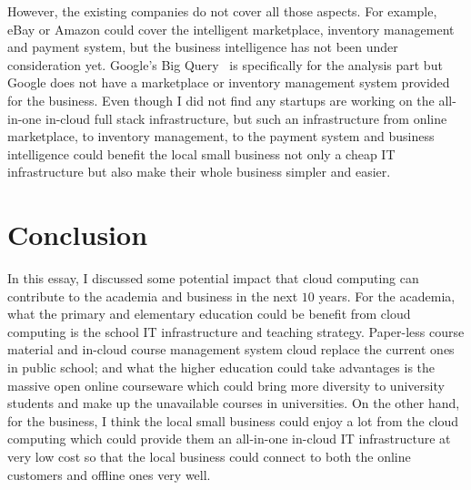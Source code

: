 However, the existing companies do not cover all those aspects. For example, eBay or Amazon could cover the intelligent marketplace, inventory management and payment system, but the business intelligence has not been under consideration yet. Google's Big Query~\cite{bigquery} is specifically for the analysis part but Google does not have a marketplace or inventory management system provided for the business. Even though I did not find any startups are working on the all-in-one in-cloud full stack infrastructure, but such an infrastructure from online marketplace, to inventory management, to the payment system and business intelligence could benefit the local small business not only a cheap IT infrastructure but also make their whole business simpler and easier. 

\section{Conclusion}
In this essay, I discussed some potential impact that cloud computing can contribute to the academia and business in the next $10$ years. For the academia, what the primary and elementary education could be benefit from cloud computing is the school IT infrastructure and teaching strategy. Paper-less course material and in-cloud course management system cloud replace the current ones in public school; and what the higher education could take advantages is the massive open online courseware which could bring more diversity to university students and make up the unavailable courses in universities. On the other hand, for the business, I think the local small business could enjoy a lot from the cloud computing which could provide them an all-in-one in-cloud IT infrastructure at very low cost so that the local business could connect to both the online customers and offline ones very well.
